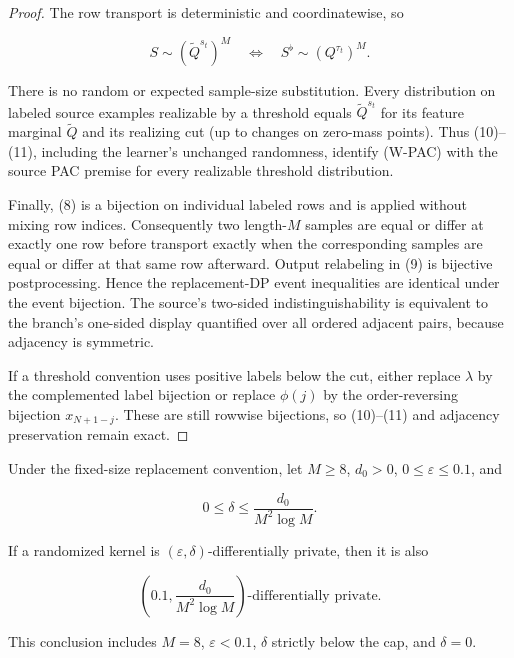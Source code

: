 \begin{proof}
The row transport is deterministic and coordinatewise, so

\[
S\sim(\widetilde Q^{s_t})^M
\quad\Longleftrightarrow\quad
S^{\flat}\sim(Q^{\tau_t})^M.
\tag{11}
\]

There is no random or expected sample-size substitution. Every distribution on labeled source examples realizable by a threshold equals \(\widetilde Q^{s_t}\) for its feature marginal \(\widetilde Q\) and its realizing cut (up to changes on zero-mass points). Thus (10)--(11), including the learner's unchanged randomness, identify (W-PAC) with the source PAC premise for every realizable threshold distribution.

Finally, (8) is a bijection on individual labeled rows and is applied without mixing row indices. Consequently two length-\(M\) samples are equal or differ at exactly one row before transport exactly when the corresponding samples are equal or differ at that same row afterward. Output relabeling in (9) is bijective postprocessing. Hence the replacement-DP event inequalities are identical under the event bijection. The source's two-sided indistinguishability is equivalent to the branch's one-sided display quantified over all ordered adjacent pairs, because adjacency is symmetric.

If a threshold convention uses positive labels below the cut, either replace \(\lambda\) by the complemented label bijection or replace \(\phi(j)\) by the order-reversing bijection \(x_{N+1-j}\). These are still rowwise bijections, so (10)--(11) and adjacency preservation remain exact. \end{proof}

\begin{lemma}\label{lem:step-002-privacy-monotonicity}
Under the fixed-size replacement convention, let \(M\ge8\), \(d_0>0\),
\(0\le\varepsilon\le0.1\), and

\[
0\le\delta\le\frac{d_0}{M^2\log M}.
\]

If a randomized kernel is \((\varepsilon,\delta)\)-differentially private, then it is also

\[
\left(0.1,\frac{d_0}{M^2\log M}\right)
\text{-differentially private}.
\]

This conclusion includes \(M=8\), \(\varepsilon<0.1\), \(\delta\) strictly below the cap, and \(\delta=0\).
\end{lemma}


